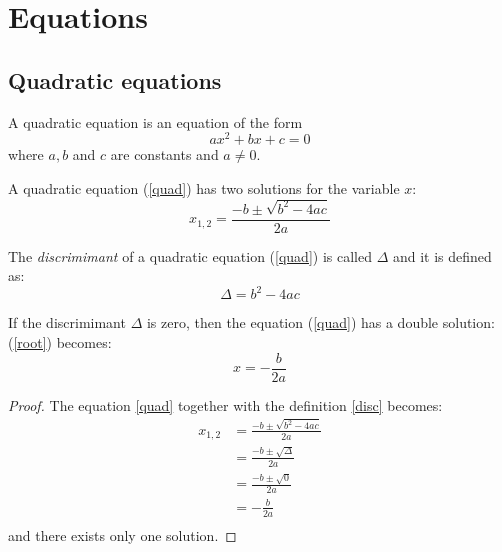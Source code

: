 \chapter{Equations}
\section{Quadratic equations}
\begin{dfn}
A quadratic equation is an equation of the form
\begin{equation}
  \label{quad}
  ax^2 + bx + c = 0
\end{equation}
where \( a, b \) and \( c \) are constants and \( a \neq 0 \).
\end{dfn}
\begin{thm}
A quadratic equation (\ref{quad}) has two solutions for the variable \( x \):
\begin{equation}
  \label{root}
  x_{1,2} = \frac{-b \pm \sqrt{b^2-4ac}}{2a}
\end{equation}
\end{thm}
\begin{dfn}
\label{disc}
The \emph{discrimimant} of a quadratic equation (\ref{quad})
is called \( \Delta \) and it is defined as:
\[
  \Delta = b^2 - 4ac
\]
\end{dfn}
\begin{lem}
If the discrimimant \( \Delta \) is zero, then the equation (\ref{quad}) has a double solution: (\ref{root}) becomes:
\[
  x = - \frac{b}{2a}
\]
\end{lem}
\begin{proof}
The equation \eqref{quad} together with the definition \ref{disc} becomes:
\begin{align*}
  x_{1,2} &= \frac{-b \pm \sqrt{b^2-4ac}}{2a} \\
          &= \frac{-b \pm \sqrt{\Delta}}{2a} \\
          &= \frac{-b \pm \sqrt{0}}{2a} \\
          &= -\frac{b}{2a} \\
\end{align*}
and there exists only one solution.
\end{proof}
